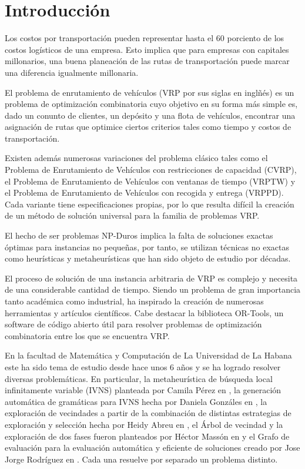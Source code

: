 \chapter*{Introducción}\label{chapter:introduction}

\qquad 
Los costos por transportación pueden representar hasta el 60 porciento de los costos logísticos de una empresa. Esto implica que para empresas con capitales millonarios, una buena planeación de las rutas de transportación puede marcar una diferencia igualmente millonaria.

El problema de enrutamiento de vehículos (VRP por sus siglas en inglñés) es un problema de optimización combinatoria cuyo objetivo en su forma más simple es, dado un conunto de clientes, un depósito y una flota de vehículos, encontrar una asignación de rutas que optimice ciertos criterios tales como tiempo y costos de transportación.

Existen además numerosas variaciones del problema clásico tales como el Problema de Enrutamiento de Vehículos con restricciones de capacidad (CVRP), el Problema de Enrutamiento de Vehículos con ventanas de tiempo (VRPTW) y el Problema de Enrutamiento de Vehículos con recogida y entrega (VRPPD). Cada variante tiene especificaciones propias, por lo que resulta difícil la creación de un método de solución universal para la familia de problemas VRP.

El hecho de ser problemas NP-Duros implica la falta de soluciones exactas óptimas para instancias no pequeñas, por tanto, se utilizan técnicas no exactas como heurísticas y metaheurísticas que han sido objeto de estudio por décadas.

El proceso de solución de una instancia arbitraria de VRP es complejo y necesita de una considerable cantidad de tiempo. Siendo un problema de gran importancia tanto académica como industrial, ha inspirado la creación de numerosas herramientas y artículos científicos. Cabe destacar la biblioteca OR-Tools, un software de código abierto útil para resolver problemas de optimización combinatoria entre los que se encuentra VRP.

En la facultad de Matemática y Computación de La Universidad de La Habana este ha sido tema de estudio desde hace unos 6 años y se ha logrado resolver diversas problemáticas. En particular, la metaheurística de búsqueda local infinitamente variable (IVNS) planteada por Camila Pérez en \cite{Camila}, la generación automática de gramáticas para IVNS hecha por Daniela Gonzáles en \cite{Daniela}, la exploración de vecindades a partir de la combinación de distintas estrategias de exploración y selección hecha por Heidy Abreu en \cite{Heidy}, el Árbol de vecindad y la exploración de dos fases fueron planteados por Héctor Massón en \cite{Hector} y el Grafo de evaluación para la evaluación automática y eficiente de soluciones creado por Jose Jorge Rodríguez en \cite{JJ}. Cada una resuelve por separado un problema distinto. 


